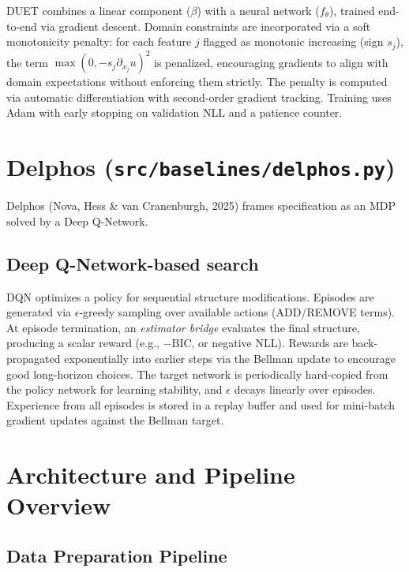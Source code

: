 \documentclass[11pt,a4paper]{article}
\begin{document}
DUET combines a linear component ($\beta$) with a neural network ($f_\theta$), trained end-to-end via gradient descent.  Domain constraints are incorporated via a soft monotonicity penalty: for each feature $j$ flagged as monotonic increasing (sign $s_j$), the term $\max(0, -s_j \partial_{x_j} u)^2$ is penalized, encouraging gradients to align with domain expectations without enforcing them strictly.  The penalty is computed via automatic differentiation with second-order gradient tracking.  Training uses Adam with early stopping on validation NLL and a patience counter.


\section{Delphos (\texttt{src/baselines/delphos.py})}
\label{sec:delphos}

Delphos (Nova, Hess \& van Cranenburgh, 2025) frames specification as an MDP solved by a Deep Q-Network.

\subsection{Deep Q-Network-based search}

DQN optimizes a policy for sequential structure modifications. Episodes are generated via $\epsilon$-greedy sampling over available actions (ADD/REMOVE terms). At episode termination, an \emph{estimator bridge} evaluates the final structure, producing a scalar reward (e.g., $-\text{BIC}$, or negative NLL).  Rewards are back-propagated exponentially into earlier steps via the Bellman update to encourage good long-horizon choices. The target network is periodically hard-copied from the policy network for learning stability, and $\epsilon$ decays linearly over episodes.  Experience from all episodes is stored in a replay buffer and used for mini-batch gradient updates against the Bellman target.


\section{Architecture and Pipeline Overview}
\label{sec:architecture}

\subsection{Data Preparation Pipeline}
\end{document}
